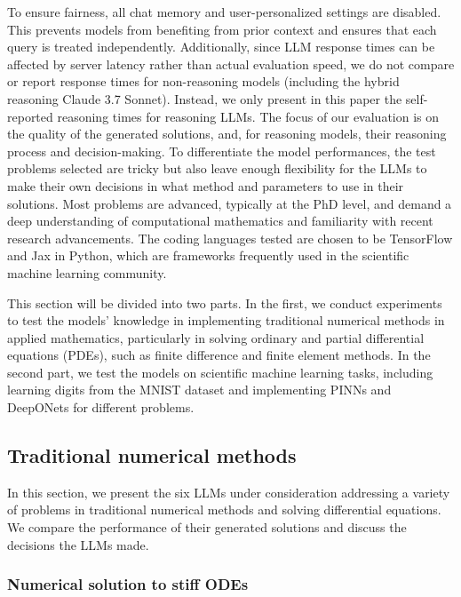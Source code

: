 \documentclass{article}
\begin{document}
To ensure fairness, all chat memory and user-personalized settings are disabled. This prevents models from benefiting from prior context and ensures that each query is treated independently. Additionally, since LLM response times can be affected by server latency rather than actual evaluation speed, we do not compare or report response times for non-reasoning models (including the hybrid reasoning Claude 3.7 Sonnet). Instead, we only present in this paper the self-reported reasoning times for reasoning LLMs. The focus of our evaluation is on the quality of the generated solutions, and, for reasoning models, their reasoning process and decision-making. To differentiate the model performances, the test problems selected are tricky but also leave enough flexibility for the LLMs to make their own decisions in what method and parameters to use in their solutions. Most problems are advanced, typically at the PhD level, and demand a deep understanding of computational mathematics and familiarity with recent research advancements. The coding languages tested are chosen to be TensorFlow \cite{tensorflow2015-whitepaper} and Jax \cite{jax2018github} in Python, which are frameworks frequently used in the scientific machine learning community. 

This section will be divided into two parts. In the first, we conduct experiments to test the models' knowledge in implementing traditional numerical methods in applied mathematics, particularly in solving ordinary and partial differential equations (PDEs), such as finite difference and finite element methods. In the second part, we test the models on scientific machine learning tasks, including learning digits from the MNIST dataset and implementing PINNs and DeepONets for different problems. 

\subsection{Traditional numerical methods}

In this section, we present the six LLMs under consideration addressing a variety of problems in traditional numerical methods and solving differential equations. We compare the performance of their generated solutions and discuss the decisions the LLMs made. 

\subsubsection{Numerical solution to stiff ODEs}
\end{document}
